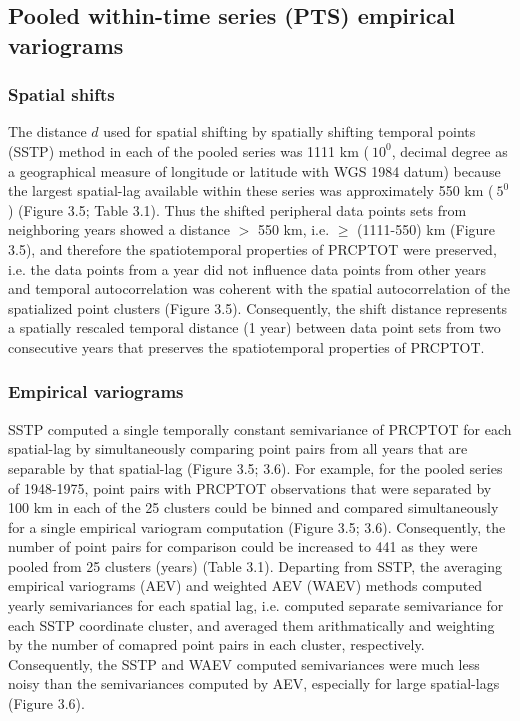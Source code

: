\subsection{Pooled within-time series (PTS) empirical variograms}
\label{Pooled within-time series (PTS) empirical variograms}

\subsubsection{Spatial shifts}
\label{Spatial shifts}

The distance $d$ used for spatial shifting by spatially shifting temporal points (SSTP) method in each of the pooled series was 1111 km ($~10^0$, decimal degree as a geographical measure of longitude or latitude with WGS 1984 datum) because the largest spatial-lag available within these series was approximately 550 km ($~5^0$) (Figure 3.5; Table 3.1). Thus the shifted peripheral data points sets from neighboring years showed a distance $>$ 550 km, i.e. $\geq$ (1111-550) km (Figure 3.5), and therefore the spatiotemporal properties of PRCPTOT were preserved, i.e. the data points from a year did not influence data points from other years and temporal autocorrelation was coherent with the spatial autocorrelation of the spatialized point clusters (Figure 3.5). Consequently, the shift distance represents a spatially rescaled temporal distance (1 year) between data point sets from two consecutive years that preserves the spatiotemporal properties of PRCPTOT.

\subsubsection{Empirical variograms}
\label{Empirical variograms}

SSTP computed a single temporally constant semivariance of PRCPTOT for each spatial-lag by simultaneously comparing point pairs from all years that are separable by that spatial-lag (Figure 3.5; 3.6). For example, for the pooled series of 1948-1975, point pairs with PRCPTOT observations that were separated by 100 km in each of the 25 clusters could be binned and compared simultaneously for a single empirical variogram computation (Figure 3.5; 3.6). Consequently, the number of point pairs for comparison could be increased to 441 as they were pooled from 25 clusters (years) (Table 3.1). Departing from SSTP, the averaging empirical variograms (AEV) and weighted AEV (WAEV) methods computed yearly semivariances for each spatial lag, i.e. computed separate semivariance for each SSTP coordinate cluster, and averaged them arithmatically and weighting by the number of comapred point pairs in each cluster, respectively. Consequently, the SSTP and WAEV computed semivariances were much less noisy than the semivariances computed by AEV, especially for large spatial-lags (Figure 3.6).

